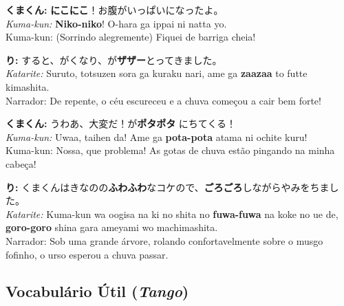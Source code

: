 \documentclass[a4paper,12pt]{article}
\begin{document}
\textbf{くまくん:} \textbf{にこにこ}！お腹がいっぱいになったよ。\\
\textit{Kuma-kun:} \textbf{Niko-niko}! O-hara ga ippai ni natta yo.\\
Kuma-kun: (Sorrindo alegremente) Fiquei de barriga cheia!

\vspace{0.5em}

\textbf{り:} すると、がくなり、が\textbf{ザザー}とってきました。\\
\textit{Katarite:} Suruto, totsuzen sora ga kuraku nari, ame ga \textbf{zaazaa} to futte kimashita.\\
Narrador: De repente, o céu escureceu e a chuva começou a cair bem forte!

\vspace{0.5em}

\textbf{くまくん:} うわあ、大変だ！が\textbf{ポタポタ} にちてくる！\\
\textit{Kuma-kun:} Uwaa, taihen da! Ame ga \textbf{pota-pota} atama ni ochite kuru!\\
Kuma-kun: Nossa, que problema! As gotas de chuva estão pingando na minha cabeça!

\vspace{0.5em}

\textbf{り:} くまくんはきなのの\textbf{ふわふわ}なコケので、\textbf{ごろごろ}しながらやみをちました。\\
\textit{Katarite:} Kuma-kun wa oogisa na ki no shita no \textbf{fuwa-fuwa} na koke no ue de, \textbf{goro-goro} shina gara ameyami wo machimashita.\\
Narrador: Sob uma grande árvore, rolando confortavelmente sobre o musgo fofinho, o urso esperou a chuva passar.

\newpage

\subsection*{Vocabulário Útil (\textit{Tango})}

\vspace{0.2cm}
\end{document}
